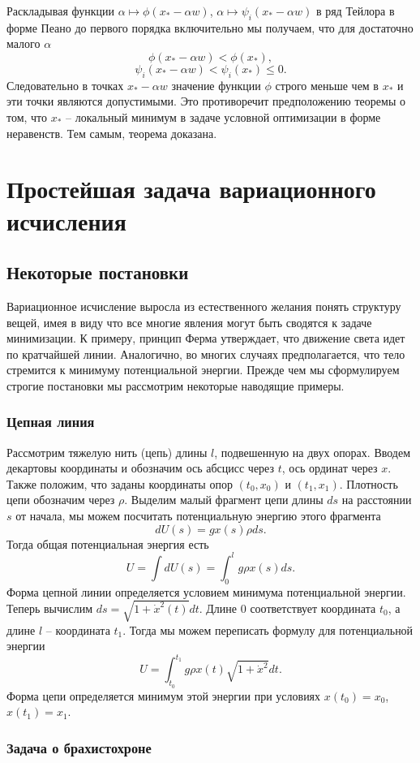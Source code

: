 \documentclass[a4paper,12pt]{report}
\begin{document}
Раскладывая функции $\alpha\mapsto \phi(x_*-\alpha w)$, $\alpha\mapsto\psi_i(x_*-\alpha w)$ в ряд Тейлора в форме Пеано до первого порядка включительно мы получаем, что для достаточно малого $\alpha$ 
$$\phi(x_*-\alpha w)<\phi(x_*), $$
$$\psi_i(x_*-\alpha w)<\psi_i(x_*)\leq 0. $$ Следовательно в точках $x_*-\alpha w$ значение функции $\phi$ строго меньше чем в $x_*$ и эти точки являются допустимыми. Это противоречит предположению теоремы о том, что $x_*$ -- локальный минимум в задаче условной оптимизации в форме неравенств. Тем самым, теорема доказана.

\chapter{Простейшая задача вариационного исчисления}
\section{Некоторые постановки}
Вариационное исчисление выросла из естественного желания понять структуру вещей, имея в виду что все многие явления могут быть сводятся к задаче минимизации. К примеру, принцип Ферма утверждает, что движение света идет по кратчайшей линии. Аналогично, во многих случаях предполагается, что тело стремится к минимуму потенциальной энергии. Прежде чем мы сформулируем строгие постановки мы рассмотрим некоторые наводящие примеры.

\subsection{Цепная линия}
Рассмотрим тяжелую нить (цепь) длины $l$, подвешенную на двух опорах. Вводем декартовы координаты и обозначим ось абсцисс через $t$, ось ординат через $x$. Также положим, что заданы координаты опор $(t_0,x_0)$ и $(t_1,x_1)$. Плотность цепи обозначим через $\rho$. Выделим малый фрагмент цепи длины $ds$ на расстоянии $s$ от начала, мы можем посчитать потенциальную энергию этого фрагмента
$$dU(s)=gx(s)\rho ds. $$ Тогда общая потенциальная энергия есть
$$U=\int dU(s)=\int_{0}^{l}g\rho x(s)ds. $$ Форма цепной линии определяется условием минимума потенциальной энергии.
Теперь вычислим $ds=\sqrt{1+\dot{x}^2(t)}dt.$ Длине $0$ соответствует координата $t_0$, а длине $l$ -- координата $t_1$. Тогда мы можем переписать формулу для потенциальной энергии
$$U=\int_{t_0}^{t_1}g\rho x(t)\sqrt{1+\dot{x}^2}dt. $$ Форма цепи определяется минимум этой энергии при условиях $x(t_0)=x_0$, $x(t_1)=x_1$.

\subsection{Задача о брахистохроне}




\end{document}
